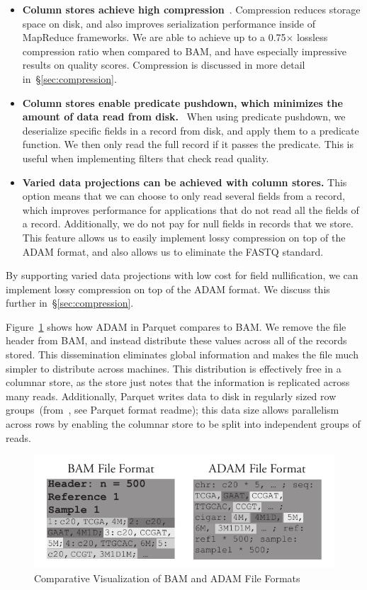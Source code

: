 \documentclass[10pt,twocolumn]{article}
\theoremstyle{plain}
\begin{document}
\begin{itemize}
\item {\bf Column stores achieve high compression}~\cite{abadi06}. Compression reduces storage space on disk, and also improves
serialization performance inside of MapReduce frameworks. We are able to achieve up to a 0.75$\times$ lossless compression
ratio when compared to BAM, and have especially impressive results on quality scores. Compression is discussed in more
detail in~\S\ref{sec:compression}.
\item {\bf Column stores enable predicate pushdown, which minimizes the amount of data read from disk.}~\cite{lamb12} When
using predicate pushdown, we deserialize specific fields in a record from disk, and apply them to a predicate function. We
then only read the full record if it passes the predicate. This is useful when implementing filters that check read quality.
\item {\bf Varied data projections can be achieved with column stores.} This option means that we can choose to only read several
fields from a record, which improves performance for applications that do not read all the fields of a record. Additionally,
we do not pay for null fields in records that we store. This feature allows us to easily implement lossy compression on top of the
ADAM format, and also allows us to eliminate the FASTQ standard.
\end{itemize}

By supporting varied data projections with low cost for field nullification, we can implement lossy compression on top
of the ADAM format. We discuss this further in~\S\ref{sec:compression}.

Figure~\ref{fig:file-format} shows how ADAM in Parquet compares to BAM. We remove the file header from BAM,
and instead distribute these values across all of the records stored. This dissemination eliminates global information and makes the file much
simpler to distribute across machines. This distribution is effectively free in a columnar store, as the store just notes that the information is
replicated across many reads. Additionally, Parquet writes data to disk in regularly sized row groups~(from~\cite{parquet}, see
Parquet format readme); this data size allows parallelism across rows by enabling the columnar store to be split into independent
groups of reads.

\begin{figure}[h]
\begin{center}
\includegraphics[width=\linewidth]{file-format.pdf}
\end{center}
\caption{Comparative Visualization of BAM and ADAM File Formats}
\label{fig:file-format}
\end{figure}
\end{document}
